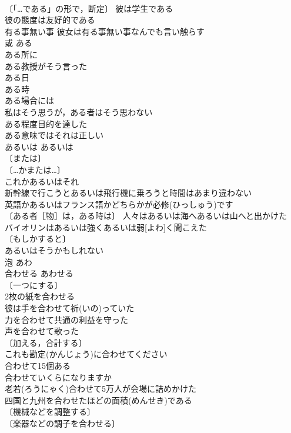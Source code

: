 \documentclass[8pt]{extreport}
\begin{document}
\begin{CJK}{UTF8}{min}
\\	〔「…である」の形で，断定〕 彼は学生である 
\\	彼の態度は友好的である 
\\	有る事無い事 彼女は有る事無い事なんでも言い触らす 
\\	或	ある	
\\	ある所に 
\\	ある教授がそう言った 
\\	ある日 
\\	ある時 
\\	ある場合には 
\\	私はそう思うが，ある者はそう思わない 
\\	ある程度目的を達した 
\\	ある意味ではそれは正しい 
\\	あるいは	あるいは	
\\	〔または〕
\\	〔…かまたは…〕
\\	これかあるいはそれ 
\\	新幹線で行こうとあるいは飛行機に乗ろうと時間はあまり違わない 
\\	英語かあるいはフランス語かどちらかが必修(ひっしゅう)です 
\\	〔ある者［物］は，ある時は〕 人々はあるいは海へあるいは山へと出かけた 
\\	バイオリンはあるいは強くあるいは弱[よわ]く聞こえた 
\\	〔もしかすると〕
\\	あるいはそうかもしれない 
\\	泡	あわ	
\\	合わせる	あわせる	
\\	〔一つにする〕
\\	2枚の紙を合わせる 
\\	彼は手を合わせて祈(いの)っていた 
\\	力を合わせて共通の利益を守った 
\\	声を合わせて歌った 
\\	〔加える，合計する〕
\\	これも勘定(かんじょう)に合わせてください 
\\	合わせて15個ある 
\\	合わせていくらになりますか 
\\	老若(ろうにゃく)合わせて5万人が会場に詰めかけた 
\\	四国と九州を合わせたほどの面積(めんせき)である 
\\	〔機械などを調整する〕
\\	〔楽器などの調子を合わせる〕

\end{CJK}
\end{document}
